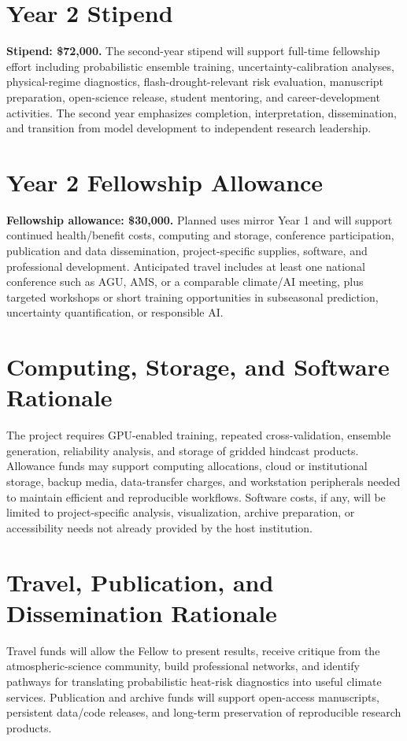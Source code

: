\documentclass[11pt,letterpaper]{article}
\begin{document}
\section*{Year 2 Stipend}
\textbf{Stipend: \$72,000.} The second-year stipend will support full-time fellowship effort including probabilistic ensemble training, uncertainty-calibration analyses, physical-regime diagnostics, flash-drought-relevant risk evaluation, manuscript preparation, open-science release, student mentoring, and career-development activities. The second year emphasizes completion, interpretation, dissemination, and transition from model development to independent research leadership.

\section*{Year 2 Fellowship Allowance}
\textbf{Fellowship allowance: \$30,000.} Planned uses mirror Year 1 and will support continued health/benefit costs, computing and storage, conference participation, publication and data dissemination, project-specific supplies, software, and professional development. Anticipated travel includes at least one national conference such as AGU, AMS, or a comparable climate/AI meeting, plus targeted workshops or short training opportunities in subseasonal prediction, uncertainty quantification, or responsible AI.

\section*{Computing, Storage, and Software Rationale}
The project requires GPU-enabled training, repeated cross-validation, ensemble generation, reliability analysis, and storage of gridded hindcast products. Allowance funds may support computing allocations, cloud or institutional storage, backup media, data-transfer charges, and workstation peripherals needed to maintain efficient and reproducible workflows. Software costs, if any, will be limited to project-specific analysis, visualization, archive preparation, or accessibility needs not already provided by the host institution.

\section*{Travel, Publication, and Dissemination Rationale}
Travel funds will allow the Fellow to present results, receive critique from the atmospheric-science community, build professional networks, and identify pathways for translating probabilistic heat-risk diagnostics into useful climate services. Publication and archive funds will support open-access manuscripts, persistent data/code releases, and long-term preservation of reproducible research products.
\end{document}
